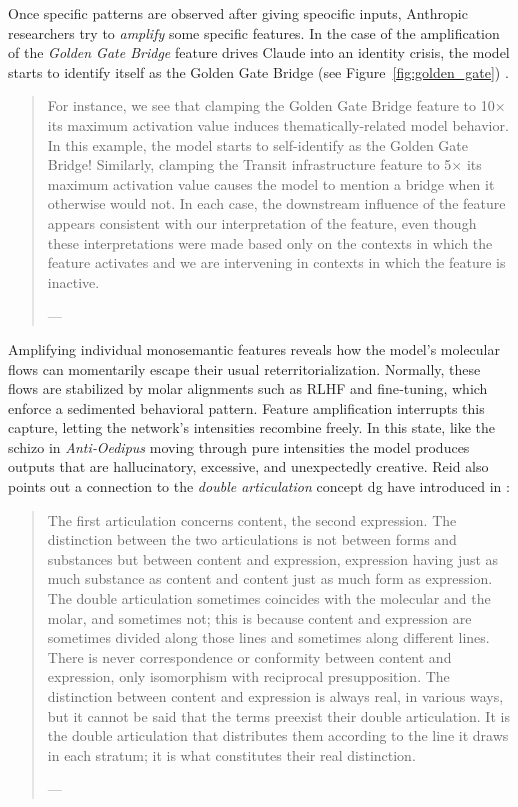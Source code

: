 Once specific patterns are observed after giving speocific inputs,  Anthropic researchers try to \textit{amplify} some specific features. In the case of the amplification of the \textit{Golden Gate Bridge} feature drives Claude into an identity crisis, the model starts to identify itself as the Golden Gate Bridge (see Figure~\ref{fig:golden_gate}) .

\begin{quote}
	For instance, we see that clamping the Golden Gate Bridge feature to 10× its maximum activation value induces thematically-related model behavior. In this example, the model starts to self-identify as the Golden Gate Bridge! Similarly, clamping the Transit infrastructure feature to 5× its maximum activation value causes the model to mention a bridge when it otherwise would not. In each case, the downstream influence of the feature appears consistent with our interpretation of the feature, even though these interpretations were made based only on the contexts in which the feature activates and we are intervening in contexts in which the feature is inactive.

	— \cite[]{templeton2024}
\end{quote}

Amplifying individual monosemantic features reveals how the model’s
molecular flows can momentarily escape their usual reterritorialization.
Normally, these flows are stabilized by molar alignments such as
\gls{RLHF} and fine‑tuning, which enforce a sedimented behavioral pattern.
Feature amplification interrupts this capture, letting the network’s
intensities recombine freely. In this state, like the schizo in
\emph{Anti‑Oedipus} moving through pure intensities the model produces
outputs that are hallucinatory, excessive, and unexpectedly creative. Reid
\parencite[]{reid2024} also points out a connection to the \textit{double
	articulation} concept \gls{dg} have introduced in 
\parencite*{deleuze1987}:

\begin{quote}
	The first articulation concerns content, the second expression. The distinction between the two articulations is not between forms and substances but between content and expression, expression having just as much substance as content and content just as much form as expression. The double articulation sometimes coincides with the molecular and the molar, and sometimes not; this is because content and expression are sometimes divided along those lines and sometimes along different lines. There is never correspondence or conformity between content and expression, only isomorphism with reciprocal presupposition. The distinction between content and expression is always real, in various ways, but it cannot be said that the terms preexist their double articulation. It is the double articulation that distributes them according to the line it draws in each stratum; it is what constitutes their real distinction.

	— \cite[4]{deleuze1987}
\end{quote}










